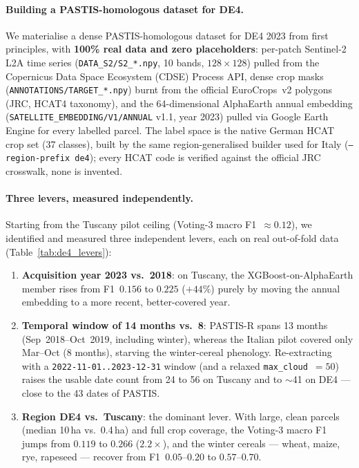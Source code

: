 \paragraph{Building a PASTIS-homologous dataset for DE4.}
We materialise a dense PASTIS-homologous dataset for DE4 2023 from first principles, with
\textbf{100\% real data and zero placeholders}: per-patch Sentinel-2 L2A time series
(\texttt{DATA\_S2/S2\_*.npy}, 10 bands, $128\times128$) pulled from the Copernicus Data
Space Ecosystem (CDSE) Process API, dense crop masks (\texttt{ANNOTATIONS/TARGET\_*.npy})
burnt from the official EuroCrops~v2 polygons (JRC, HCAT4 taxonomy), and the 64-dimensional
AlphaEarth annual embedding (\texttt{SATELLITE\_EMBEDDING/V1/ANNUAL} v1.1, year 2023) pulled
via Google Earth Engine for every labelled parcel. The label space is the native German
HCAT crop set (37 classes), built by the same region-generalised builder used for Italy
(\texttt{--region-prefix de4}); every HCAT code is verified against the official JRC
crosswalk, none is invented.

\paragraph{Three levers, measured independently.}
Starting from the Tuscany pilot ceiling (Voting-3 macro F1~$\approx0.12$), we identified and
measured three independent levers, each on real out-of-fold data
(Table~\ref{tab:de4_levers}):
\begin{enumerate}[leftmargin=1.4em,itemsep=2pt]
  \item \textbf{Acquisition year 2023 vs.\ 2018}: on Tuscany, the XGBoost-on-AlphaEarth
    member rises from F1~$0.156$ to $0.225$ ($+44\%$) purely by moving the annual embedding
    to a more recent, better-covered year. %
  \item \textbf{Temporal window of 14 months vs.\ 8}: PASTIS-R spans 13 months
    (Sep~2018--Oct~2019, including winter), whereas the Italian pilot covered only
    Mar--Oct (8 months), starving the winter-cereal phenology. Re-extracting with a
    \texttt{2022-11-01..2023-12-31} window (and a relaxed \texttt{max\_cloud}~$=50$) raises
    the usable date count from 24 to 56 on Tuscany and to $\sim$41 on DE4 --- close to the
    43 dates of PASTIS. %
  \item \textbf{Region DE4 vs.\ Tuscany}: the dominant lever. With large, clean parcels
    (median 10\,ha vs.\ 0.4\,ha) and full crop coverage, the Voting-3 macro F1 jumps from
    $0.119$ to $0.266$ ($2.2\times$), and the winter cereals --- wheat, maize, rye, rapeseed
    --- recover from F1~$0.05$--$0.20$ to $0.57$--$0.70$. %
\end{enumerate}

